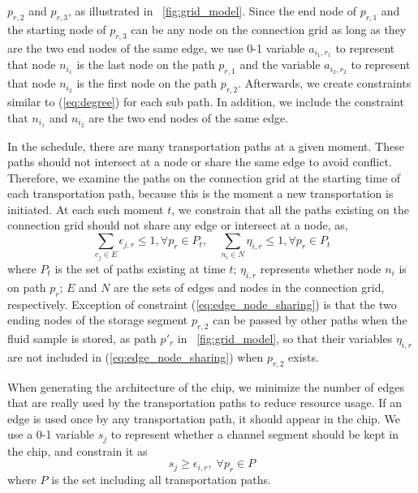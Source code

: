             $p_{r, 2}$ and $p_{r,3}$, as illustrated in \figname~\ref{fig:grid_model}.
            Since the end node of $p_{r,1}$ and the starting
            node of $p_{r, 3}$ can be any node on the connection grid as long as they are
            the two end nodes of the same edge,
            we use 0-1 variable $a_{i_1,r_1}$ to represent that node
            $n_{i_1}$ is the last node on the path $p_{r,1}$ and the
            variable $a_{i_2,r_2}$ to represent that node
            $n_{i_2}$ is the first node on the path $p_{r,2}$.
            Afterwards, we create constraints similar to (\ref{eq:degree}) for each
            sub path. In addition, we include the constraint that $n_{i_1}$ and $n_{i_2}$
            are the two end nodes of the same edge.

In the schedule, there are many transportation paths
at a given moment. These paths should not
intersect at a node or share the same edge to avoid conflict.
Therefore, we examine the paths on the connection grid at the starting time of each
transportation path, because this is the moment a new transportation is
initiated. At each such moment $t$, we constrain that all the paths existing on
the connection grid should not share any edge or intersect at a node, as,
\begin{equation}\label{eq:edge_node_sharing}
\sum_{e_j\in E} \epsilon_{j,r}\le 1, \forall p_r\in P_t, \quad
\sum_{n_i\in N} \eta_{i,r}\le 1, \forall  p_r\in P_t
\end{equation}
where $P_t$ is the set of paths existing at time $t$;
$\eta_{i,r}$ represents whether node $n_i$ is on path $p_r$;
$E$ and $N$ are the sets
of edges and nodes in the connection grid, respectively. Exception of
constraint (\ref{eq:edge_node_sharing}) is that the two ending nodes of the
storage segment $p_{r,2}$ can be passed by other paths when the fluid sample is stored,
as path $p'_r$ in \figname~\ref{fig:grid_model}, so that their variables
$\eta_{i,r}$ are not included in (\ref{eq:edge_node_sharing}) when $p_{r,2}$
exists. %

When generating the architecture of the chip, we minimize the number of edges
that are really used by the transportation paths
to reduce resource usage. If an edge is used once by any transportation path,
it should appear in the chip. We use a 0-1 variable $s_j$ to represent whether
a channel segment should be kept in the chip, and constrain it as
\begin{equation}\label {eq:edge_app}
s_j\ge \epsilon_{i,r}, \; \forall p_r\in P
\end{equation}
where $P$ is the set including all transportation paths.

